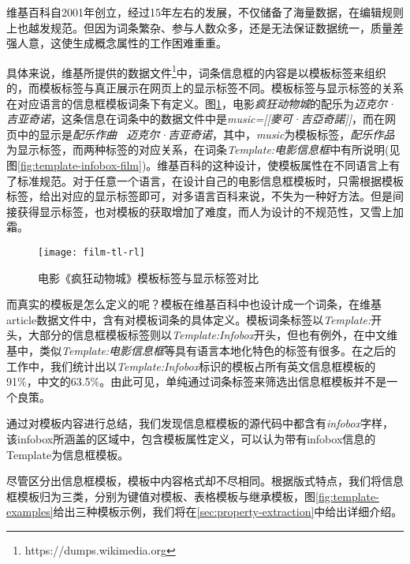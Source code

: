 维基百科自2001年创立，经过15年左右的发展，不仅储备了海量数据，在编辑规则上也越发规范。但因为词条繁杂、参与人数众多，还是无法保证数据统一，质量差强人意，这使生成概念属性的工作困难重重。

具体来说，维基所提供的数据文件\footnote{https://dumps.wikimedia.org}中，词条信息框的内容是以{\heiti 模板标签}来组织的，而模板标签与真正展示在网页上的{\heiti 显示标签}不同。模板标签与显示标签的关系在对应语言的信息框模板词条下有定义。图\ref{fig:film-tl-rl}，电影\textit{疯狂动物城}的配乐为\textit{迈克尔·吉亚奇诺}，这条信息在词条中的数据文件中是\textit{music=[[麥可·吉亞奇諾]]}，而在网页中的显示是\textit{配乐作曲 \ 迈克尔·吉亚奇诺}，其中，\textit{music}为模板标签，\textit{配乐作品}为显示标签，而两种标签的对应关系，在词条\textit{Template:电影信息框}中有所说明(见图\ref{fig:template-infobox-film})。维基百科的这种设计，使模板属性在不同语言上有了标准规范。对于任意一个语言，在设计自己的电影信息框模板时，只需根据模板标签，给出对应的显示标签即可，对多语言百科来说，不失为一种好方法。但是间接获得显示标签，也对模板的获取增加了难度，而人为设计的不规范性，又雪上加霜。

\begin{figure}[ht]
  \centering
  \texttt{[image: film-tl-rl]}
  \caption{电影《疯狂动物城》模板标签与显示标签对比}
  \label{fig:film-tl-rl}
\end{figure}

而真实的模板是怎么定义的呢？模板在维基百科中也设计成一个词条，在维基article数据文件中，含有对模板词条的具体定义。模板词条标签以\textit{Template:}开头，大部分的信息框模板标签则以\textit{Template:Infobox}开头，但也有例外，在中文维基中，类似\textit{Template:电影信息框}等具有语言本地化特色的标签有很多。在之后的工作中，我们统计出以\textit{Template:Infobox}标识的模板占所有英文信息框模板的91\%，中文的63.5\%。由此可见，单纯通过词条标签来筛选出信息框模板并不是一个良策。

通过对模板内容进行总结，我们发现信息框模板的源代码中都含有\textit{infobox}字样，该infobox所涵盖的区域中，包含模板属性定义，可以认为带有infobox信息的Template为信息框模板。

尽管区分出信息框模板，模板中内容格式却不尽相同。根据版式特点，我们将信息框模板归为三类，分别为键值对模板、表格模板与继承模板，图\ref{fig:template-examples}给出三种模板示例，我们将在\ref{sec:property-extraction}中给出详细介绍。

